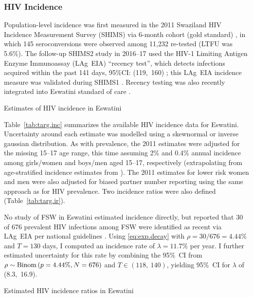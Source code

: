 \subsubsection{HIV Incidence}\label{model.cal.targ.inc}
Population-level incidence was first measured in the 2011
Swaziland HIV Incidence Measurement Survey (SHIMS)
via 6-month cohort (gold standard) \cite{SHIMS1,Justman2016},
in which 145 seroconversions were observed among 11,232 re-tested (LTFU was 5.6\%).
The follow-up SHIMS2 study in 2016--17 used
the HIV-1 Limiting Antigen Enzyme Immunoassay (LAg~EIA) ``recency test'',
which detects infections acquired within the past 141 days, 95\%CI: (119,~160) \cite{Duong2012};
this LAg~EIA incidence measure was validated during SHIMS1 \cite{SHIMS1}.
Recency testing was also recently integrated into Eswatini standard of care \cite{EswCOP21}.
\par
\begin{table}
  \centering
  \caption{Estimates of HIV incidence in Eswatini}
  \label{tab:targ.inc}
  
\end{table}
Table~\ref{tab:targ.inc} summarizes the available HIV incidence data for Eswatini.
Uncertainty around each estimate was modelled using a skewnormal or inverse gaussian distribution.
As with prevalence, the 2011 estimates were adjusted for the missing 15--17 age range,
this time assuming 2\% and 0.4\% annual incidence
among girls/women and boys/men aged 15--17, respectively
(extrapolating from age-stratified incidence estimates from \cite{Justman2016}).
The 2011 estimates for lower risk women and men were also adjusted
for biased partner number reporting using the same approach as for HIV prevalence.
Two incidence ratios were also defined (Table~\ref{tab:targ.ir}).
\par
No study of FSW in Eswatini estimated incidence directly,
but \cite{EswIBBS2022} reported that 30 of 676 prevalent HIV infections among FSW
were identified as recent via LAg~EIA per national guidelines \cite{SHIMS2,EswCOP21}.
Using \eqref{eq:exp.decay} with $\rho = 30/676 = 4.44\%$ and $T = 130$ days,
I computed an incidence rate of $\lambda = 11.7\%$ per year.
I further estimated uncertainty for this rate by combining
the 95\%~CI from $\rho \sim \operatorname{Binom}\,(p = 4.44\%, N = 676)$ and $T \in (118,~140)$,
yielding 95\%~CI for $\lambda$ of (8.3,~16.9).
\begin{table}
  \centering
  \caption{Estimated HIV incidence ratios in Eswatini}
  \label{tab:targ.ir}
  
\end{table}
